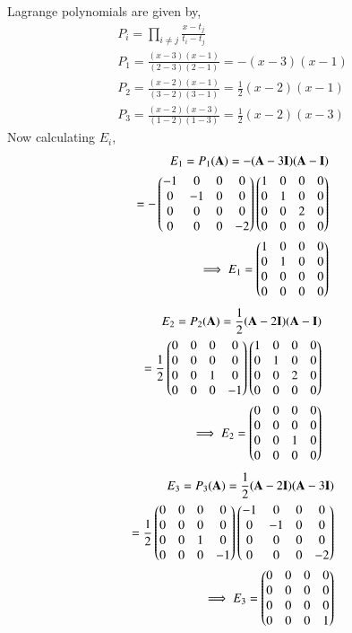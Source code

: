 Lagrange polynomials are given by,
\begin{align}
P_i = \prod_{i\neq j}\frac{x-t_j}{t_i-t_j}\\
P_1 = \frac{(x-3)(x-1)}{(2-3)(2-1)} = -(x-3)(x-1)\\
P_2 = \frac{(x-2)(x-1)}{(3-2)(3-1)} = \frac{1}{2}(x-2)(x-1)\\
P_3 = \frac{(x-2)(x-3)}{(1-2)(1-3)} = \frac{1}{2}(x-2)(x-3)
\end{align}
Now calculating $E_i$,
\begin{align}
E_1 = P_1(\mathbf{A})=-(\mathbf{A}-3\mathbf{I})(\mathbf{A}-\mathbf{I})\\=
-\begin{pmatrix}-1&0&0&0\\0&-1&0&0\\0&0&0&0\\0&0&0&-2\end{pmatrix}\begin{pmatrix}1&0&0&0\\0&1&0&0\\0&0&2&0\\0&0&0&0\end{pmatrix}\\
\implies E_1=\begin{pmatrix}1&0&0&0\\0&1&0&0\\0&0&0&0\\0&0&0&0\end{pmatrix}
\end{align}
\begin{align}
E_2 = P_2(\mathbf{A})=\frac{1}{2}(\mathbf{A}-2\mathbf{I})(\mathbf{A}-\mathbf{I})\\=
\frac{1}{2}\begin{pmatrix}0&0&0&0\\0&0&0&0\\0&0&1&0\\0&0&0&-1\end{pmatrix}\begin{pmatrix}1&0&0&0\\0&1&0&0\\0&0&2&0\\0&0&0&0\end{pmatrix}\\
\implies E_2=\begin{pmatrix}0&0&0&0\\0&0&0&0\\0&0&1&0\\0&0&0&0\end{pmatrix}
\end{align}
\begin{align}
E_3 = P_3(\mathbf{A})=\frac{1}{2}(\mathbf{A}-2\mathbf{I})(\mathbf{A}-3\mathbf{I})\\=
\frac{1}{2}\begin{pmatrix}0&0&0&0\\0&0&0&0\\0&0&1&0\\0&0&0&-1\end{pmatrix}\begin{pmatrix}-1&0&0&0\\0&-1&0&0\\0&0&0&0\\0&0&0&-2\end{pmatrix}\\
\implies E_3=\begin{pmatrix}0&0&0&0\\0&0&0&0\\0&0&0&0\\0&0&0&1\end{pmatrix}
\end{align}
